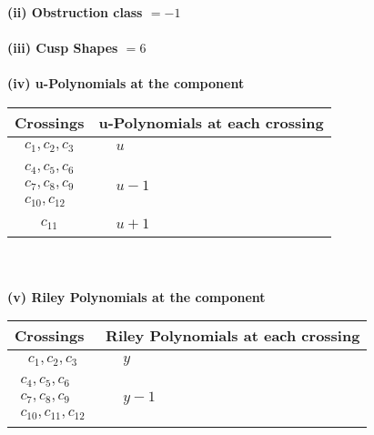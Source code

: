 \documentclass[1p]{elsarticle_modified}
\theoremstyle{definition}
\begin{document}
\flushleft \textbf{(ii) Obstruction class $= -1$}\\~\\
\flushleft \textbf{(iii) Cusp Shapes $= 6$}\\~\\
\newpage\renewcommand{\arraystretch}{1}
\flushleft \textbf{(iv) u-Polynomials at the component}\newline \\
\begin{tabular}{m{50pt}|m{274pt}}
Crossings & \hspace{64pt}u-Polynomials at each crossing \\
\hline $$\begin{aligned}c_{1},c_{2},c_{3}\end{aligned}$$&$\begin{aligned}
&u
\end{aligned}$\\
\hline $$\begin{aligned}c_{4},c_{5},c_{6}\\c_{7},c_{8},c_{9}\\c_{10},c_{12}\end{aligned}$$&$\begin{aligned}
&u-1
\end{aligned}$\\
\hline $$\begin{aligned}c_{11}\end{aligned}$$&$\begin{aligned}
&u+1
\end{aligned}$\\
\hline
\end{tabular}\\~\\
\newpage\renewcommand{\arraystretch}{1}
\flushleft \textbf{(v) Riley Polynomials at the component}\newline \\
\begin{tabular}{m{50pt}|m{274pt}}
Crossings & \hspace{64pt}Riley Polynomials at each crossing \\
\hline $$\begin{aligned}c_{1},c_{2},c_{3}\end{aligned}$$&$\begin{aligned}
&y
\end{aligned}$\\
\hline $$\begin{aligned}c_{4},c_{5},c_{6}\\c_{7},c_{8},c_{9}\\c_{10},c_{11},c_{12}\end{aligned}$$&$\begin{aligned}
&y-1
\end{aligned}$\\
\hline
\end{tabular}\\~\\
\end{document}

